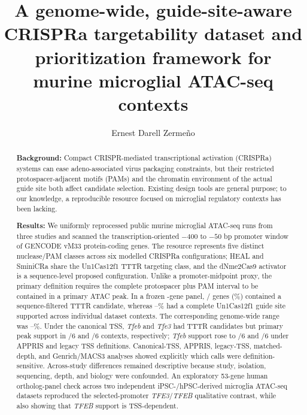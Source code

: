 \documentclass[11pt]{article}
\begin{document}
\title{A genome-wide, guide-site-aware CRISPRa targetability dataset and prioritization framework for murine microglial ATAC-seq contexts}
\author[1,2,*]{Ernest Darell Zerme\~no}
\date{}
\maketitle

\begin{abstract}
\textbf{Background:} Compact CRISPR-mediated transcriptional activation (CRISPRa) systems can ease adeno-associated virus packaging constraints, but their restricted protospacer-adjacent motifs (PAMs) and the chromatin environment of the actual guide site both affect candidate selection. Existing design tools are general purpose; to our knowledge, a reproducible resource focused on microglial regulatory contexts has been lacking.

\textbf{Results:} We uniformly reprocessed \NRun{} public murine microglial ATAC-seq runs from three studies and scanned the transcription-oriented $-400$ to $-50$ bp promoter window of \NGeneFormatted{} GENCODE vM33 protein-coding genes. The resource represents five distinct nuclease/PAM classes across six modelled CRISPRa configurations; HEAL and SminiCRa share the Un1Cas12f1 TTTR targeting class, and the dNme2Cas9 activator is a sequence-level proposed configuration. Unlike a promoter-midpoint proxy, the primary definition requires the complete protospacer plus PAM interval to be contained in a primary ATAC peak. In a frozen \NPanel{}-gene panel, \UnPanelPamN/\NPanel{} genes (\UnPanelPamPct\%) contained a sequence-filtered TTTR candidate, whereas \UnPanelTargetMinPct--\UnPanelTargetMaxPct\% had a complete Un1Cas12f1 guide site supported across individual dataset contexts. The corresponding genome-wide range was \UnGenomeTargetMinPct--\UnGenomeTargetMaxPct\%. Under the canonical TSS, \textit{Tfeb} and \textit{Tfe3} had TTTR candidates but primary peak support in \TfebUnContextsN/6 and \TfeThreeUnContextsN/6 contexts, respectively; \textit{Tfeb} support rose to \TfebApprisContextsN/6 and \TfebLegacyContextsN/6 under APPRIS and legacy TSS definitions. Canonical-TSS, APPRIS, legacy-TSS, matched-depth, and Genrich/MACS3 analyses showed explicitly which calls were definition-sensitive. Across-study differences remained descriptive because study, isolation, sequencing, depth, and biology were confounded. An exploratory 53-gene human ortholog-panel check across two independent iPSC-/hPSC-derived microglia ATAC-seq datasets reproduced the selected-promoter \textit{TFE3}/\textit{TFEB} qualitative contrast, while also showing that \textit{TFEB} support is TSS-dependent.


\end{abstract}
\end{document}
